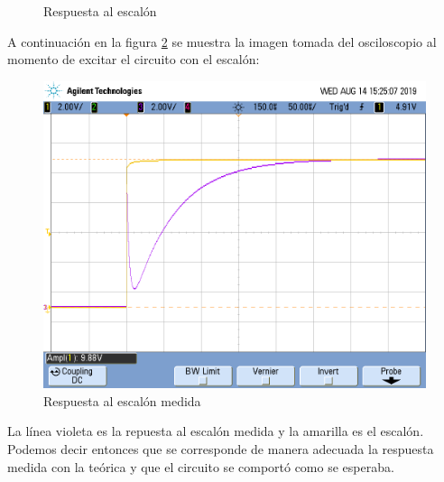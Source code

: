 \begin{figure}[H] 
\begin{center}
\caption{Respuesta al escalón}
\label{respuestaalescalon}
\end{center}
\end{figure}



A continuación en la figura \ref{rtaalescalonosciloscopio} se muestra la imagen tomada del osciloscopio al momento de excitar el circuito con el escalón:

\begin{figure}[H]                                                       
    \centering\includegraphics[width=\textwidth]{resources/rtaalescalon.png}
    \caption{Respuesta al escalón medida}
\label{rtaalescalonosciloscopio}
\end{figure}

La línea violeta es la repuesta al escalón  medida y la amarilla es el escalón. Podemos decir entonces  que se corresponde de manera adecuada la respuesta medida con la teórica y que el circuito se comportó como se esperaba.
 
%